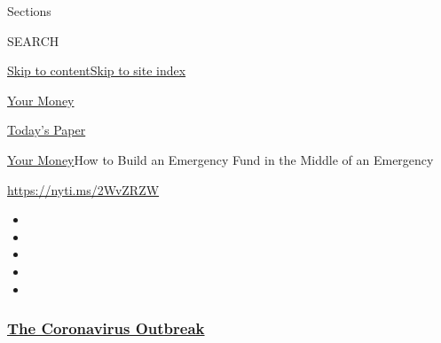 Sections

SEARCH

\protect\hyperlink{site-content}{Skip to
content}\protect\hyperlink{site-index}{Skip to site index}

\href{https://www.nytimes3xbfgragh.onion/section/your-money}{Your Money}

\href{https://myaccount.nytimes3xbfgragh.onion/auth/login?response_type=cookie\&client_id=vi}{}

\href{https://www.nytimes3xbfgragh.onion/section/todayspaper}{Today's
Paper}

\href{/section/your-money}{Your Money}\textbar{}How to Build an
Emergency Fund in the Middle of an Emergency

\url{https://nyti.ms/2WvZRZW}

\begin{itemize}
\item
\item
\item
\item
\item
\end{itemize}

\hypertarget{the-coronavirus-outbreak}{%
\subsubsection{\texorpdfstring{\href{https://www.nytimes3xbfgragh.onion/news-event/coronavirus?name=styln-coronavirus-national\&region=TOP_BANNER\&block=storyline_menu_recirc\&action=click\&pgtype=Article\&impression_id=f32f8f30-efb9-11ea-a193-7f67ec27f149\&variant=undefined}{The
Coronavirus
Outbreak}}{The Coronavirus Outbreak}}\label{the-coronavirus-outbreak}}

